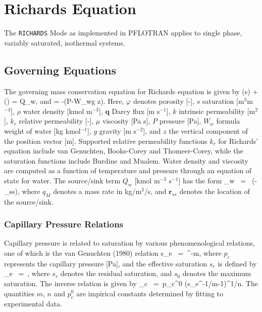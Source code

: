 \documentclass[12pt]{article}
\def\EQ#1\EN{\begin{equation}#1\end{equation}}
\newcommand{\eq}{\ =\ }
\newcommand{\p}{{\partial}}
\newcommand{\bnabla}{\boldsymbol{\nabla}}
\newcommand{\bq}{\boldsymbol{q}}
\newcommand{\br}{\boldsymbol{r}}
\begin{document}

\section{Richards Equation}

The {\tt RICHARDS} Mode as implemented in PFLOTRAN applies to single phase, variably saturated, isothermal systems. 

\subsection{Governing Equations}

The governing mass conservation equation for Richards equation is given by
\EQ
\frac{\p}{\p t}\left(\varphi s\rho\right) + \bnabla\cdot\left(\rho\bq\right) = Q_w,
\EN
and
\EQ
\bq = -\bnabla\left(P-W_w\rho g z\right).
\EN
Here, $\varphi$ denotes porosity [-], 
$s$ saturation [m$^3$m$^{-3}$], 
$\rho$ water density [kmol m$^{-3}$], 
$\bq$ Darcy flux [m s$^{-1}$], 
$k$ intrinsic permeability [m$^2$], 
$k_r$ relative permeability [-], 
$\mu$ viscosity [Pa s], 
$P$ pressure [Pa], 
$W_w$ formula weight of water [kg kmol$^{-1}$], 
$g$ gravity [m s$^{-2}$], and 
$z$ the vertical component of the position vector [m].  
Supported relative permeability functions $k_r$ for Richards' equation include van Genuchten, Books-Corey and Thomeer-Corey, while the saturation functions include Burdine and Mualem.  Water density and viscosity are computed as a function of temperature and pressure through an equation of state for water. The source/sink term $Q_w$ [kmol m$^{-3}$ s$^{-1}$] has the form
\EQ
Q_w \eq {} \delta(\br-\br_{ss}),
\EN
where $q_M$ denotes a mass rate in kg/m$^{3}$/s, and $\br_{ss}$ denotes the location of the source/sink.

\subsubsection{Capillary Pressure Relations}

Capillary pressure is related to saturation by various 
phenomenological relations, one of which is the van Genuchten 
(1980) relation 
\EQ\label{seff}
s_e \eq {}^{-m}, 
\EN 
where $p_c$ represents the capillary pressure [Pa], and the effective saturation $s_e$ is defined by 
\EQ 
s_e \eq {}, 
\EN 
where $s_r$ denotes the residual saturation, and $s_0$ denotes 
the maximum saturation. 
The inverse relation is given by
\EQ
p_c \eq p_c^0 \left(s_e^{-1/m}-1\right)^{1/n}.
\EN
The quantities $m$, $n$ and $p_c^0$ are impirical constants determined by fitting to experimental data.
\end{document}
